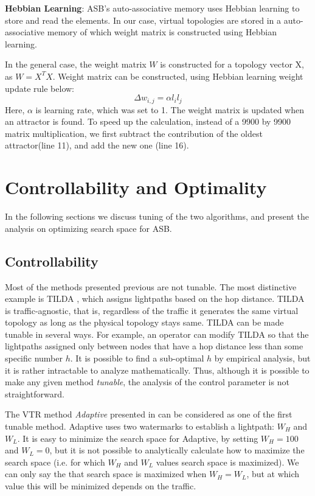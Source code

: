 \documentclass[conference]{IEEEtran}
\begin{document}
{\bf Hebbian Learning}:
ASB's auto-associative memory uses Hebbian learning to store and read the elements. In our case, virtual topologies are stored 
in a auto-associative memory of which weight matrix is constructed using Hebbian learning.
 
In the general case, the weight matrix $W$ is constructed for a topology vector
X, as $W=X^{T} X$. Weight matrix can be constructed, using Hebbian learning weight update rule below:
\begin{equation}\label{hebbeq}
 \Delta w_{i,j} = {{\alpha}} l_{i} l_{j} 
\end{equation}
Here, $\alpha$ is 
learning rate, which was set to 1. The weight matrix is updated when an attractor is found. 
To speed up the calculation, instead of a 9900 by 9900 matrix multiplication, we first subtract the contribution of the oldest attractor(line 11), and add the new one (line 16).
\section{Controllability and Optimality}\label{methodology}
In the following sections we discuss tuning of the two algorithms, and present the analysis on optimizing search space for ASB.
 
\subsection{Controllability}
Most of the methods presented previous are not tunable.  
The most distinctive example is TILDA \cite{Ramaswami:DLTW96}, which assigns lightpaths based 
on the hop distance. TILDA is traffic-agnostic, that is, regardless of the traffic it generates the same virtual topology
as long as the physical topology stays same. TILDA can be made tunable  in several ways.
For example, an operator can modify TILDA so that the lightpaths assigned only between nodes that have a hop distance less than some specific number $h$.
It is possible to find a  sub-optimal $h$ by empirical analysis, but it is rather intractable to analyze mathematically.
Thus, although it is possible to make any given method {\em tunable}, 
the analysis of the control parameter is not straightforward.

The VTR method {\em Adaptive} presented in \cite{gencata:virtual-topology} can be considered as one of the first tunable method.
Adaptive uses two watermarks to establish a lightpath: $W_H$ and $W_L$. 
It is easy to minimize the search space for Adaptive, by setting $W_H =100$ and $W_L=0$, but it is not 
possible to analytically calculate how to maximize the search space (i.e. for which $W_H$ and $W_L$ values search space is maximized).
We can only say the that search space is maximized when $W_H=W_L$, but at which value this will be minimized depends on the traffic.
\end{document}
